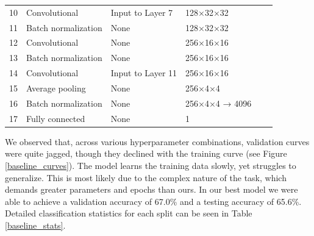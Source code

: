 \documentclass{article} %
\begin{document}
\begin{table}[t]
\begin{center}
\begin{tabular}{llllll}
            10                                & Convolutional                      & Input to Layer 7                             & 128×32×32                                         \\
            11                                & Batch normalization                & None                                         & 128×32×32                                         \\
            12                                & Convolutional                      & None                                         & 256×16×16                                         \\
            13                                & Batch normalization                & None                                         & 256×16×16                                         \\
            14                                & Convolutional                      & Input to Layer 11                            & 256×16×16                                         \\
            15                                & Average pooling                    & None                                         & 256×4×4                                           \\
            16                                & Batch normalization                & None                                         & 256×4×4 → 4096                                    \\
            17                                & Fully connected                    & None                                         & 1                                                 \\
        \end{tabular}
    \end{center}
\end{table}

We observed that, across various hyperparameter combinations, validation curves were quite jagged, though they declined with the training curve (see Figure \ref{baseline_curves}). The model learns the training data slowly, yet struggles to generalize. This is most likely due to the complex nature of the task, which demands greater parameters and epochs than ours. In our best model we were able to achieve a validation accuracy of 67.0\% and a testing accuracy of 65.6\%. Detailed classification statistics for each split can be seen in Table \ref{baseline_stats}.
\end{document}
